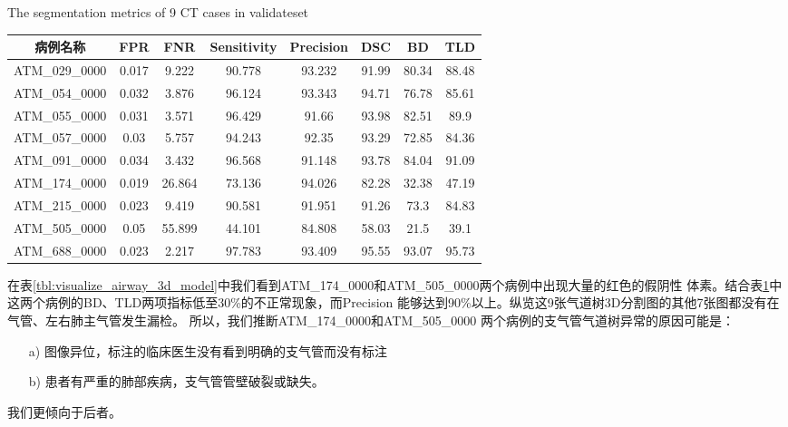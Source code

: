 \begin{table}[!htp]
        {The segmentation metrics of 9 CT cases in validateset}
    \centering
    \label{tbl:validateset_airway_tree_metrics}
\begin{tabular}{cccccccc}
        \toprule
        病例名称          & FPR           & FNR            & Sensitivity     & Precision      & DSC           & BD            & TLD           \\
        \midrule
        ATM\_029\_0000 & 0.017           & 9.222          & 90.778          & 93.232         & 91.99         & 80.34         & 88.48         \\
        ATM\_054\_0000 & 0.032           & 3.876          & 96.124          & 93.343         & 94.71         & 76.78         & 85.61         \\
        ATM\_055\_0000 & 0.031           & 3.571          & 96.429          & 91.66          & 93.98         & 82.51         & 89.9          \\
        ATM\_057\_0000 & 0.03            & 5.757          & 94.243          & 92.35          & 93.29         & 72.85         & 84.36         \\
        ATM\_091\_0000 & 0.034           & 3.432          & 96.568          & 91.148         & 93.78         & 84.04         & 91.09         \\
        ATM\_174\_0000 & 0.019           & 26.864         & 73.136          & 94.026         & 82.28         & 32.38         & 47.19         \\
        ATM\_215\_0000 & 0.023           & 9.419          & 90.581          & 91.951         & 91.26         & 73.3          & 84.83         \\
        ATM\_505\_0000 & 0.05            & 55.899         & 44.101          & 84.808         & 58.03         & 21.5          & 39.1          \\
        ATM\_688\_0000 & 0.023           & 2.217          & 97.783          & 93.409         & 95.55         & 93.07         & 95.73         \\
        \bottomrule
    \end{tabular}
\end{table}
在表\ref{tbl:visualize_airway_3d_model}中我们看到ATM\_174\_0000和ATM\_505\_0000两个病例中出现大量的红色的假阴性
体素。结合表\ref{tbl:validateset_airway_tree_metrics}中这两个病例的BD、TLD两项指标低至30\%的不正常现象，而Precision
能够达到90\%以上。纵览这9张气道树3D分割图的其他7张图都没有在气管、左右肺主气管发生漏检。 所以，我们推断ATM\_174\_0000和ATM\_505\_0000
两个病例的支气管气道树异常的原因可能是：
\begin{enumerate}
    \item[a)] 图像异位，标注的临床医生没有看到明确的支气管而没有标注
    \item[b)] 患者有严重的肺部疾病，支气管管壁破裂或缺失。
\end{enumerate}
我们更倾向于后者。

